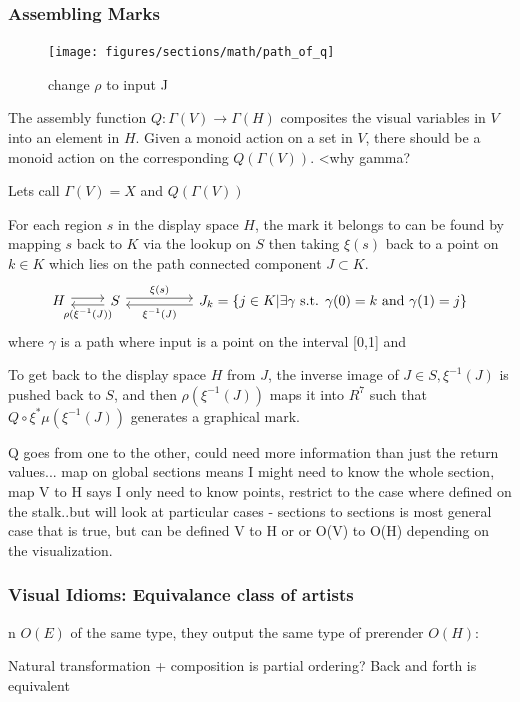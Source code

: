 \documentclass[../main.tex]{subfiles}
\begin{document}
\subsubsection{Assembling Marks}

\begin{figure}[H]
    \texttt{[image: figures/sections/math/path\_of\_q]}
    \label{fig:q}
    \caption{change $\rho$ to input J}
\end{figure}

The assembly function $Q: \Gamma(V) \rightarrow \Gamma(H)$ composites the visual variables in $V$ into an element in $H$. Given a monoid action on a set in $V$, there should be a monoid action on the corresponding $Q(\Gamma(V))$. <why gamma? 

Lets call $\Gamma(V) = X$ and $Q(\Gamma(V))$



For each region $s$ in the display space $H$, the mark  \cite{bertinIIPropertiesGraphic2011,carpendaleVisualRepresentationSemiology} it belongs to can be found by mapping $s$ back to $K$ via the lookup on $S$ then taking $\xi(s)$ back to a point on $k \in K$ which lies on the path connected component $J \subset K$. 
\begin{equation}
    \begin{tikzcd}
        H \arrow[r, shift left] & S \arrow[l, "\rho(\xi^{-1}(J))", shift left] \arrow[rr, "\xi(s)", shift left] &  & J_{k} =  \{j \in K| \exists \gamma \text{ s.t. } \gamma(0)=k \text{ and }\gamma(1)=j\} \arrow[ll, "\xi^{-1}(J)", shift left]
    \end{tikzcd}
    \label{eq:mark}
\end{equation}
where $\gamma$ is a path where input is a point on the interval [0,1] and 



To get back to the display space $H$ from $J$, the inverse image of $J \in S, \xi^{-1}(J)$ is pushed back to $S$, and then $\rho(\xi^{-1}(J))$ maps it into $R^{7}$ such that $Q\circ\xi^*\mu(\xi^{-1}(J))$ generates a graphical mark.



Q goes from one to the other, could need more information than just the return values... map on global sections means I might need to know the whole section, map V to H says I only need to know points, restrict to the case where defined on the stalk..but will look at particular cases - sections to sections is most general case that is true, but can be defined V to H or or O(V) to O(H) depending on the visualization. 

\subsubsection{Visual Idioms: Equivalance class of artists}
n $O(E)$ of the same type, they output the same type of prerender $O(H)$:


Natural transformation + composition is partial ordering? Back and forth is equivalent 
\end{document}
